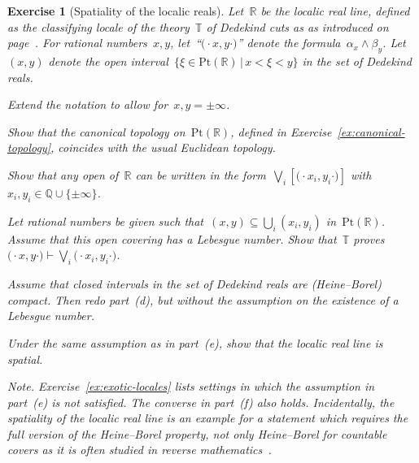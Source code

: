 \documentclass{ws-rv9x6}
\newtheorem{ex}{Exercise}
\newenvironment{exercise}[1]{
  \begin{ex}[#1]
}{\end{ex}}
\newcommand{\QQ}{\mathbb{Q}}
\newcommand{\RR}{\mathbb{R}}
\newcommand{\TT}{\mathbb{T}}
\renewcommand{\_}{\mathpunct{.}}
\newcommand{\?}{\,{:}\,}
\newcommand{\Pt}{\mathrm{Pt}}
\begin{document}
\begin{exercise}{Spatiality of the localic reals}%
\label{ex:spatiality-reals}%
\newcommand{\fa}{\ensuremath{(\!\cdot}}%
\newcommand{\fb}{\ensuremath{\cdot\!)}}%
Let~$\RR$ be the localic real line, defined as the classifying locale of the
theory~$\TT$ of Dedekind cuts as as introduced on
page~\pageref{par:dedekind-cuts}. For rational numbers~$x,y$, let~``$\fa x,y
\fb$'' denote the formula~$\alpha_x \wedge \beta_y$. Let~$(x,y)$ denote the
open interval~$\{ \xi \in \Pt(\RR) \,|\, x < \xi < y \}$ in the set of Dedekind reals.
\begin{alphlist}[(f)]
\item Extend the notation to allow for~$x,y=\pm\infty$.
\item Show that the canonical topology on~$\Pt(\RR)$, defined in
Exercise~\ref{ex:canonical-topology}, coincides with the usual Euclidean
topology.
\item Show that any open of~$\RR$ can be written in the form~$\bigvee_i
[\fa x_i,y_i \fb]$ with~$x_i,y_i \in \QQ \cup \{\pm\infty\}$.
\item Let rational numbers be given such that~$(x,y) \subseteq \bigcup_i
(x_i,y_i)$ in~$\Pt(\RR)$. Assume that this open covering has a Lebesgue number.
Show that~$\TT$ proves~$\fa x,y \fb \vdash \bigvee_i \fa x_i,y_i \fb$.
\item Assume that closed intervals in the set of Dedekind reals are
(Heine--Borel) compact. Then redo part~(d), but without the assumption on the
existence of a Lebesgue number.
\item Under the same assumption as in part~(e), show that the localic real line
is spatial.
\end{alphlist}
{\scriptsize\emph{Note.} Exercise~\ref{ex:exotic-locales} lists settings in
which the assumption in part~(e) is not satisfied. The converse in part~(f)
also holds. Incidentally, the spatiality of the localic real line is an example
for a statement which requires the full version of the Heine--Borel property,
not only Heine--Borel for countable covers as it is often studied in reverse
mathematics~\cite{normann-sanders:uncountable}.\par}
\end{exercise}
\end{document}
